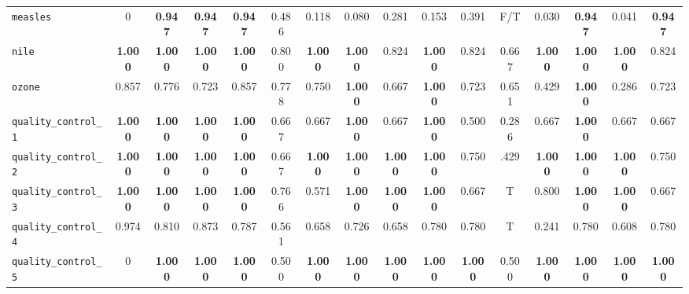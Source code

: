 \begin{table*}[h!]
\begin{adjustbox}{width=\textwidth}
\begin{tabular}{l|c|cccccccccccccc}
    \cellcolor{gray!100}\verb+measles+ & \cellcolor{gray!100}0 & \cellcolor{gray!100}\textbf{0.947} & \cellcolor{gray!100}\textbf{0.947} & \cellcolor{gray!100}\textbf{0.947} & \cellcolor{gray!100}0.486 & \cellcolor{gray!100}0.118 & \cellcolor{gray!100}0.080 & \cellcolor{gray!100}0.281 & \cellcolor{gray!100}0.153 & \cellcolor{gray!100}0.391 & \cellcolor{gray!100}F/T & \cellcolor{gray!100}0.030 & \cellcolor{gray!100}\textbf{0.947} & \cellcolor{gray!100}0.041 & \cellcolor{gray!100}\textbf{0.947}\\
    
    \verb+nile+ & \textbf{1.000} & \textbf{1.000} & \textbf{1.000} & \textbf{1.000} & 0.800 & \textbf{1.000} & \textbf{1.000} & 0.824 & \textbf{1.000} & 0.824 & 0.667 & \textbf{1.000} & \textbf{1.000} & \textbf{1.000} & 0.824\\
    
    \verb+ozone+ & \cellcolor{orange!0}0.857 & 0.776 & 0.723 & 0.857 & 0.778 & 0.750 & \textbf{1.000} & 0.667 & \textbf{1.000} & 0.723 & 0.651 & 0.429 & \textbf{1.000} & 0.286 & 0.723\\
    
    \verb+quality_control_1+ & \textbf{1.000} & \textbf{1.000} & \textbf{1.000} & \textbf{1.000} & 0.667 & 0.667 & \textbf{1.000} & 0.667 & \textbf{1.000} & 0.500 & 0.286 & 0.667 & \textbf{1.000} & 0.667 & 0.667\\
    
    \verb+quality_control_2+ & \textbf{1.000} & \textbf{1.000} & \textbf{1.000} & \textbf{1.000} & 0.667 & \textbf{1.000} & \textbf{1.000} & \textbf{1.000} & \textbf{1.000} & 0.750 & .429 & \textbf{1.000} & \textbf{1.000} & \textbf{1.000} & 0.750\\
    
    \verb+quality_control_3+ & \textbf{1.000} & \textbf{1.000} & \textbf{1.000} & \textbf{1.000} & 0.766 & 0.571 & \textbf{1.000} & \textbf{1.000} & \textbf{1.000} & 0.667 & T & 0.800 & \textbf{1.000} & \textbf{1.000} & 0.667\\
    
    \verb+quality_control_4+ & \cellcolor{cyan!10}0.974 & 0.810 & 0.873 & 0.787 & 0.561 & 0.658 & 0.726 & 0.658 & 0.780 & 0.780 & T & 0.241 & 0.780 & 0.608 & 0.780\\
    
    \cellcolor{gray!100}\verb+quality_control_5+ & \cellcolor{gray!100}0 & \cellcolor{gray!100}\textbf{1.000} & \cellcolor{gray!100}\textbf{1.000} & \cellcolor{gray!100}\textbf{1.000} & \cellcolor{gray!100}0.500 & \cellcolor{gray!100}\textbf{1.000} & \cellcolor{gray!100}\textbf{1.000} & \cellcolor{gray!100}\textbf{1.000} & \cellcolor{gray!100}\textbf{1.000} & \cellcolor{gray!100}\textbf{1.000} & \cellcolor{gray!100}0.500 & \cellcolor{gray!100}\textbf{1.000} & \cellcolor{gray!100}\textbf{1.000} & \cellcolor{gray!100}\textbf{1.000} & \cellcolor{gray!100}\textbf{1.000}\\
    

\end{tabular}
\end{adjustbox}
\end{table*}
